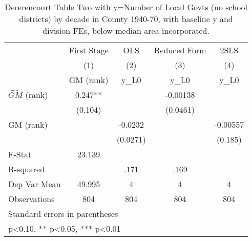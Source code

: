 \begin{table}[htbp]\centering
\def\sym#1{\ifmmode^{#1}\else\(^{#1}\)\fi}
\caption{Dererencourt Table Two with y=Number of Local Govts (no school districts) by decade in County 1940-70, with baseline y and division FEs, below median area incorporated.}
\begin{tabular}{l*{4}{c}}
\toprule
                    & First Stage   &         OLS   &Reduced Form   &        2SLS   \\
                    &\multicolumn{1}{c}{(1)}&\multicolumn{1}{c}{(2)}&\multicolumn{1}{c}{(3)}&\multicolumn{1}{c}{(4)}\\
                    &\multicolumn{1}{c}{GM  (rank)}&\multicolumn{1}{c}{y\_L0}&\multicolumn{1}{c}{y\_L0}&\multicolumn{1}{c}{y\_L0}\\
\midrule
$\hat{GM}$ (rank)   &       0.247** &               &    -0.00138   &               \\
                    &     (0.104)   &               &    (0.0461)   &               \\
\addlinespace
GM  (rank)          &               &     -0.0232   &               &    -0.00557   \\
                    &               &    (0.0271)   &               &     (0.185)   \\
\midrule
F-Stat              &      23.139   &               &               &               \\
R-squared           &               &        .171   &        .169   &               \\
Dep Var Mean        &      49.995   &           4   &           4   &           4   \\
Observations        &         804   &         804   &         804   &         804   \\
\bottomrule
\multicolumn{5}{l}{\footnotesize Standard errors in parentheses}\\
\multicolumn{5}{l}{\footnotesize * p<0.10, ** p<0.05, *** p<0.01}\\
\end{tabular}
\end{table}
